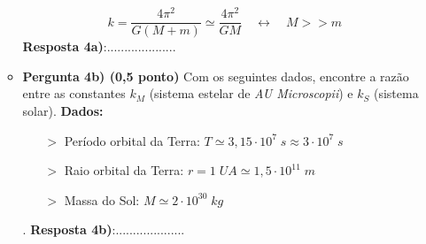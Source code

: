 \documentclass[a4paper, 12pt]{article}
\begin{document}
\begin{flushleft}
\begin{itemize}
\begin{itemize}
						$$k = \frac{4 \pi^2}{G(M+m)} \simeq \frac{4 \pi^2}{GM} \quad \leftrightarrow \quad M>>m$$
					\linebreak \linebreak \linebreak \linebreak \linebreak \linebreak \linebreak \linebreak \linebreak \linebreak
					\textbf{Resposta 4a)}:....................
				\item \textbf{Pergunta 4b) (0,5 ponto)} Com os seguintes dados, encontre a razão entre as constantes $k_M$ (sistema estelar de \textit{AU Microscopii}) e $k_S$ (sistema solar). \linebreak
					\textbf{Dados:}
						\begin{itemize}
							\item[$>$] Período orbital da Terra: $T \simeq 3,15 \cdot 10^7 \; s \approx 3 \cdot 10^7 \; s$
							\item[$>$] Raio orbital da Terra: $r = 1 \; UA \simeq 1,5 \cdot 10^{11} \; m$
							\item[$>$] Massa do Sol: $M \simeq 2 \cdot 10^{30} \; kg$
						\end{itemize}
					.\linebreak \linebreak \linebreak \linebreak \linebreak \linebreak \linebreak \linebreak
					\textbf{Resposta 4b)}:....................
			\end{itemize}
			

\end{itemize}
\end{flushleft}
\end{document}
